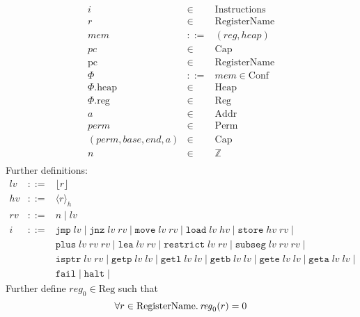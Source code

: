 \documentclass[a4paper]{article}
\newcommand{\var}[1]{\mathit{#1}}
\newcommand{\hv}{\var{hv}}
\newcommand{\rv}{\var{rv}}
\newcommand{\lv}{\var{lv}}
\newcommand{\pc}{\mathit{pc}}
\newcommand{\pcreg}{\mathrm{pc}}
\newcommand{\addr}{\var{a}}
\newcommand{\start}{\var{base}}
\newcommand{\addrend}{\var{end}}
\newcommand{\mem}{\var{mem}}
\newcommand{\reg}{\var{reg}}
\newcommand{\heap}{\var{heap}}
\newcommand{\perm}{\var{perm}}
\newcommand{\plainproj}[1]{\mathrm{#1}}
\newcommand{\memheap}[1][\Phi]{#1.\plainproj{heap}}
\newcommand{\memreg}[1][\Phi]{#1.\plainproj{reg}}
\newcommand{\plaindom}[1]{\mathrm{#1}}
\newcommand{\Caps}{\plaindom{Cap}}
\newcommand{\Addrs}{\plaindom{Addr}}
\newcommand{\RegName}{\plaindom{RegisterName}}
\newcommand{\Regs}{\plaindom{Reg}}
\newcommand{\Heaps}{\plaindom{Heap}}
\newcommand{\Confs}{\plaindom{Conf}}
\newcommand{\Instrs}{\plaindom{Instructions}}
\newcommand{\ints}{\mathbb{Z}}
\newcommand{\Perms}{\plaindom{Perm}}
\newcommand{\refreg}[1]{\lfloor #1 \rfloor}
\newcommand{\refheap}[1]{\langle #1 \rangle_h}
\newcommand{\zinstr}[1]{\mathtt{#1}}
\newcommand{\fail}{\zinstr{fail}}
\newcommand{\halt}{\zinstr{halt}}
\newcommand{\oneinstr}[2]{\zinstr{#1} \; #2}
\newcommand{\jmp}[1]{\oneinstr{jmp}{#1}}
\newcommand{\twoinstr}[3]{\zinstr{#1} \; #2 \; #3}
\newcommand{\restricttwo}[2]{\twoinstr{restrict}{#1}{#2}}
\newcommand{\jnz}[2]{\twoinstr{jnz}{#1}{#2}}
\newcommand{\isptr}[2]{\twoinstr{isptr}{#1}{#2}}
\newcommand{\geta}[2]{\twoinstr{geta}{#1}{#2}}
\newcommand{\getb}[2]{\twoinstr{getb}{#1}{#2}}
\newcommand{\gete}[2]{\twoinstr{gete}{#1}{#2}}
\newcommand{\getp}[2]{\twoinstr{getp}{#1}{#2}}
\newcommand{\getl}[2]{\twoinstr{getl}{#1}{#2}}
\newcommand{\move}[2]{\twoinstr{move}{#1}{#2}}
\newcommand{\store}[2]{\twoinstr{store}{#1}{#2}}
\newcommand{\load}[2]{\twoinstr{load}{#1}{#2}}
\newcommand{\lea}[2]{\twoinstr{lea}{#1}{#2}}
\newcommand{\threeinstr}[4]{\zinstr{#1} \; #2 \; #3 \; #4}
\newcommand{\subseg}[3]{\threeinstr{subseg}{#1}{#2}{#3}}
\newcommand{\plus}[3]{\threeinstr{plus}{#1}{#2}{#3}}
\begin{document}
\[
\begin{array}{rcl}
i       &\in& \Instrs \\
r       &\in& \RegName\\
\mem    &::=& (\reg,\heap)\\
\pc     &\in& \Caps \\
\pcreg  &\in& \RegName \\
\Phi    &::=& \mem \in \Confs\\
\memheap&\in& \Heaps \\
\memreg &\in& \Regs \\
\addr   &\in& \Addrs\\
\perm   &\in& \Perms\\
(\perm,\start,\addrend,\addr) &\in& \Caps \\
n       &\in& \ints\\
\end{array}
\]
Further definitions:
\[
\begin{array}{rcl}
\lv    &::=& \refreg{r} \\
\hv    &::=& \refheap{r}\\
\rv    &::=& n \mid \lv \\
i      &::=& 
             \jmp{\lv} \mid 
             \jnz{\lv}{\rv} \mid
             \move{\lv}{\rv} \mid 
             \load{\lv}{\hv} \mid 
             \store{\hv}{\rv} \mid  \\
       &   & \plus{\lv}{\rv}{\rv} \mid 
             \lea{\lv}{\rv} \mid 
             \restricttwo{\lv}{\rv} \mid 
             \subseg{\lv}{\rv}{\rv} \mid  \\
       &   & \isptr{\lv}{\rv} \mid 
             \getp{\lv}{\lv} \mid 
             \getl{\lv}{\lv} \mid 
             \getb{\lv}{\lv} \mid
             \gete{\lv}{\lv} \mid
             \geta{\lv}{\lv} \mid \\
       &   & \fail \mid
             \halt \mid 
\end{array}
\]
Further define $\reg_0 \in \Regs$ such that
\[
  \forall r \in \RegName \ldotp \reg_0(r) = 0
\]
\end{document}
